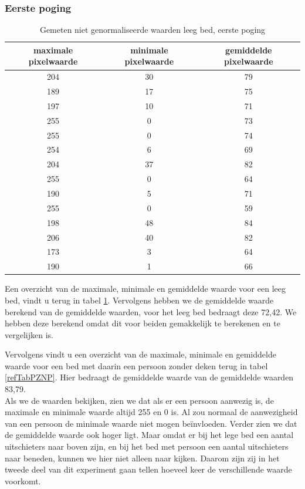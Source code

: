 \subsubsection{Eerste poging} 
\begin{table}[hbp]
	\caption{Gemeten niet genormaliseerde waarden leeg bed, eerste poging}		
	\begin{tabular}{|c|c|c|}	
		\hline
		maximale pixelwaarde & minimale pixelwaarde & gemiddelde pixelwaarde \\ \hline
		204 & 30 & 79 \\ \hline
		189 & 17 & 75 \\ \hline
		197 & 10 & 71 \\ \hline
		255 & 0 & 73 \\ \hline
		255 & 0 & 74 \\ \hline
		254 & 6 & 69 \\ \hline
		204 & 37 & 82 \\ \hline
		255 & 0 & 64 \\ \hline
		190 & 5 & 71 \\ \hline
		255 & 0 & 59 \\ \hline
		198 & 48 & 84 \\ \hline
		206 & 40 & 82 \\ \hline
		173 & 3 & 64 \\ \hline
		190 & 1 & 66 \\ \hline
	\end{tabular}
	\label{refTabPZNL}
\end{table}
Een overzicht van de maximale, minimale en gemiddelde waarde voor een leeg bed, vindt u terug in tabel \ref{refTabPZNL}. Vervolgens hebben we de gemiddelde waarde berekend van de gemiddelde waarden, voor het leeg bed bedraagt deze 72,42. We hebben deze berekend omdat dit voor beiden gemakkelijk te berekenen en te vergelijken is. 

Vervolgens vindt u een overzicht van de maximale, minimale en gemiddelde waarde voor een bed met daarin een persoon zonder deken terug in tabel \ref{refTabPZNP}. Hier bedraagt de gemiddelde waarde van de gemiddelde waarden 83,79. \\
Als we de waarden bekijken, zien we dat als er een persoon aanwezig is, de maximale en minimale waarde altijd 255 en 0 is. Al zou normaal de aanwezigheid van een persoon de minimale waarde niet mogen be\"invloeden. Verder zien we dat de gemiddelde waarde ook hoger ligt. Maar omdat er bij het lege bed een aantal uitschieters naar boven zijn, en bij het bed met persoon een aantal uitschieters naar beneden, kunnen we hier niet alleen naar kijken. Daarom zijn zij in het tweede deel van dit experiment gaan tellen hoeveel keer de verschillende waarde voorkomt.

